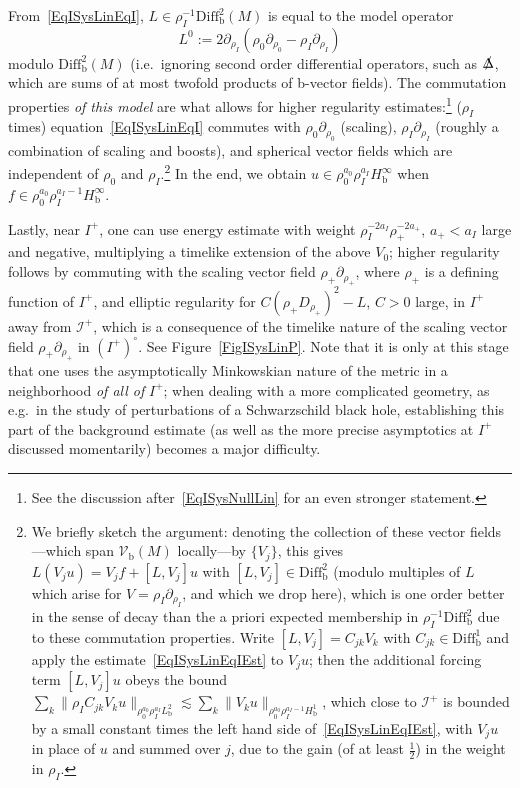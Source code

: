 \documentclass[reqno,11pt,letterpaper]{amsart}
\numberwithin{equation}{section}
\numberwithin{figure}{section}
\theoremstyle{definition}
\theoremstyle{remark}
\newcommand{\ms}{\mathscr}
\newcommand{\scri}{\ms I}
\newcommand{\slDelta}{\slashed{\Delta}{}}
\newcommand{\pa}{\partial}
\newcommand{\bop}{{\mathrm{b}}}
\newcommand{\Diff}{\mathrm{Diff}}
\newcommand{\Vf}{\mathcal V}
\newcommand{\Vb}{\Vf_\bop}
\newcommand{\Diffb}{\Diff_\bop}
\newcommand{\half}{\tfrac{1}{2}}
\newcommand{\Hb}{H_{\bop}}
\begin{document}
From~\eqref{EqISysLinEqI}, $L\in\rho_I^{-1}\Diffb^2(M)$ is equal to the model operator
\[
  L^0 := 2\pa_{\rho_I}(\rho_0\pa_{\rho_0}-\rho_I\pa_{\rho_I})
\]
modulo $\Diffb^2(M)$ (i.e.\ ignoring second order differential operators, such as $\slDelta$, which are sums of at most twofold products of b-vector fields). The commutation properties \emph{of this model} are what allows for higher regularity estimates:\footnote{See the discussion after~\eqref{EqISysNullLin} for an even stronger statement.} ($\rho_I$ times) equation~\eqref{EqISysLinEqI} commutes with $\rho_0\pa_{\rho_0}$ (scaling), $\rho_I\pa_{\rho_I}$ (roughly a combination of scaling and boosts), and spherical vector fields which are independent of $\rho_0$ and $\rho_I$.\footnote{We briefly sketch the argument: denoting the collection of these vector fields---which span $\Vb(M)$ locally---by $\{V_j\}$, this gives $L(V_j u)=V_j f+[L,V_j]u$ with $[L,V_j]\in\Diffb^2$ (modulo multiples of $L$ which arise for $V=\rho_I\pa_{\rho_I}$, and which we drop here), which is one order better in the sense of decay than the a priori expected membership in $\rho_I^{-1}\Diffb^2$ due to these commutation properties. Write $[L,V_j]=C_{j k}V_k$ with $C_{j k}\in\Diffb^1$ and apply the estimate~\eqref{EqISysLinEqIEst} to $V_j u$; then the additional forcing term $[L,V_j]u$ obeys the bound $\sum_k\|\rho_I C_{j k}V_k u\|_{\rho_0^{a_0}\rho_I^{a_I}L^2_\bop}\lesssim\sum_k\|V_k u\|_{\rho_0^{a_0}\rho_I^{a_I-1}\Hb^1}$, which close to $\scri^+$ is bounded by a small constant times the left hand side of~\eqref{EqISysLinEqIEst}, with $V_j u$ in place of $u$ and summed over $j$, due to the gain (of at least $\half$) in the weight in $\rho_I$.} In the end, we obtain $u\in\rho_0^{a_0}\rho_I^{a_I}\Hb^\infty$ when $f\in\rho_0^{a_0}\rho_I^{a_I-1}\Hb^\infty$.

Lastly, near $I^+$, one can use energy estimate with weight $\rho_I^{-2 a_I}\rho_+^{-2 a_+}$, $a_+<a_I$ large and negative, multiplying a timelike extension of the above $V_0$; higher regularity follows by commuting with the scaling vector field $\rho_+\pa_{\rho_+}$, where $\rho_+$ is a defining function of $I^+$, and elliptic regularity for $C(\rho_+ D_{\rho_+})^2-L$, $C>0$ large, in $I^+$ away from $\scri^+$, which is a consequence of the timelike nature of the scaling vector field $\rho_+\pa_{\rho_+}$ in $(I^+)^\circ$. See Figure~\ref{FigISysLinP}. Note that it is only at this stage that one uses the asymptotically Minkowskian nature of the metric in a neighborhood \emph{of all of} $I^+$; when dealing with a more complicated geometry, as e.g.\ in the study of perturbations of a Schwarzschild black hole, establishing this part of the background estimate (as well as the more precise asymptotics at $I^+$ discussed momentarily) becomes a major difficulty.
\end{document}
